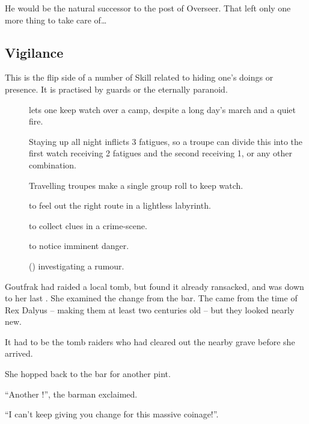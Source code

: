 \begin{multicols}{2}
\begin{exampletext}
  He would be the natural successor to the post of Overseer.
  That left only one more thing to take care of\ldots
  
\end{exampletext}

\subsection{Vigilance}

This is the flip side of a number of Skill related to hiding one's doings or presence.
It is practised by guards or the eternally paranoid.

\begin{description}
  \item[]
    lets one keep watch over a camp, despite a long day's march and a quiet fire.

    Staying up all night inflicts 3 \glspl{fatigue}, so a troupe can divide this into the first watch receiving 2 \glspl{fatigue} and the second receiving 1, or any other combination.

    Travelling troupes make a single group roll to keep watch.

  \item[]
    to feel out the right route in a lightless labyrinth.
  \item[]
    to collect clues in a crime-scene.
  \item[]
    to notice imminent danger.
  \item[] (\tn[14])
    investigating a rumour.
\end{description}

\ifodd\value{r4}
\begin{exampletext}
  Goutfrak had raided a local tomb, but found it already ransacked, and was down to her last .
  She examined the change from the bar.
  The  came from the time of Rex Dalyus -- making them at least two centuries old -- but they looked nearly new.

  It had to be the tomb raiders who had cleared out the nearby grave before she arrived.

  She hopped back to the bar for another pint.

  ``Another !'',
  the barman exclaimed.

  ``I can't keep giving you change for this massive coinage!''.


\end{exampletext}
\end{multicols}
